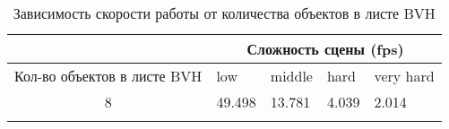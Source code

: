 \begin{center}
\begin{longtable}{|c|p{2cm}|p{2cm}|p{2cm}|p{2cm}|}
\hline & \multicolumn{4}{c|}{Сложность сцены (fps)} \\ 
\hline Кол-во объектов в листе BVH & low & middle & hard &  very hard\\ 
\hline 8 &  49.498 & 13.781 & 4.039 & 2.014 \\ 
\hline
\caption{Зависимость скорости работы от количества объектов в листе BVH}\label{tab:performance_bvh}\end{longtable}
\end{center}

